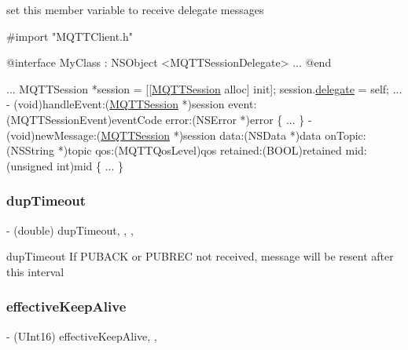 set this member variable to receive delegate messages 
\begin{DoxyCode}
\textcolor{preprocessor}{#import "MQTTClient.h"}

\textcolor{keyword}{@interface }MyClass : NSObject <MQTTSessionDelegate>
...
\textcolor{keyword}{@end}

...
MQTTSession *session = [[\hyperlink{interface_m_q_t_t_session}{MQTTSession} alloc] init];
session.\hyperlink{interface_m_q_t_t_session_a1a8eb040c4fd693c218999bae64d1281}{delegate} = \textcolor{keyword}{self};
...
- (void)handleEvent:(\hyperlink{interface_m_q_t_t_session}{MQTTSession} *)session
       event:(MQTTSessionEvent)eventCode
       error:(NSError *)error \{
   ...
\}
- (void)newMessage:(\hyperlink{interface_m_q_t_t_session}{MQTTSession} *)session
       data:(NSData *)data
       onTopic:(NSString *)topic
       qos:(MQTTQosLevel)qos
       retained:(BOOL)retained
       mid:(\textcolor{keywordtype}{unsigned} \textcolor{keywordtype}{int})mid \{
   ...
\}
\end{DoxyCode}
 \mbox{\label{interface_m_q_t_t_session_a92914b34c08b83665b838ec9f75f983c}} 
\subsubsection{\texorpdfstring{dup\+Timeout}{dupTimeout}}
{\footnotesize\ttfamily -\/ (double) dup\+Timeout\hspace{0.3cm}{\ttfamily [read]}, {\ttfamily [write]}, {\ttfamily [nonatomic]}, {\ttfamily [assign]}}

dup\+Timeout If P\+U\+B\+A\+CK or P\+U\+B\+R\+EC not received, message will be resent after this interval \mbox{\label{interface_m_q_t_t_session_a18c68ee9ea84d8a008a3893aa8e95f03}} 
\subsubsection{\texorpdfstring{effective\+Keep\+Alive}{effectiveKeepAlive}}
{\footnotesize\ttfamily -\/ (U\+Int16) effective\+Keep\+Alive\hspace{0.3cm}{\ttfamily [read]}, {\ttfamily [nonatomic]}, {\ttfamily [assign]}}

